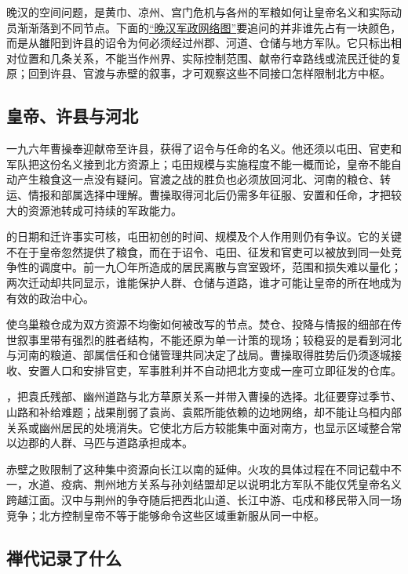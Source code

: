 晚汉的空间问题，是黄巾、凉州、宫门危机与各州的军粮如何让皇帝名义和实际动员渐渐落到不同节点。下面的\hyperref[fig:late-han-regions]{“晚汉军政网络图”}要追问的并非谁先占有一块颜色，而是从雒阳到许县的诏令为何必须经过州郡、河道、仓储与地方军队。它只标出相对位置和几条关系，不能当作州界、实际控制范围、献帝行幸路线或流民迁徙的复原；回到许县、官渡与赤壁的叙事，才可观察这些不同接口怎样限制北方中枢。


\subsection{皇帝、许县与河北}

一九六年曹操奉迎献帝至许县，获得了诏令与任命的名义。他还须以屯田、官吏和军队把这份名义接到北方资源上；屯田规模与实施程度不能一概而论，皇帝不能自动产生粮食这一点没有疑问。官渡之战的胜负也必须放回河北、河南的粮仓、转运、情报和部属选择中理解。曹操取得河北后仍需多年征服、安置和任命，才把较大的资源池转成可持续的军政能力。

的日期和迁许事实可核，屯田初创的时间、规模及个人作用则仍有争议。它的关键不在于皇帝忽然提供了粮食，而在于诏令、屯田、征发和官吏可以被放到同一处竞争性的调度中。前一九〇年所造成的居民离散与宫室毁坏，范围和损失难以量化；两次迁动却共同显示，谁能保护人群、仓储与道路，谁才可能让皇帝的所在地成为有效的政治中心。

使乌巢粮仓成为双方资源不均衡如何被改写的节点。焚仓、投降与情报的细部在传世叙事里带有强烈的胜者结构，不能还原为单一计策的现场；较稳妥的是看到河北与河南的粮道、部属信任和仓储管理共同决定了战局。曹操取得胜势后仍须逐城接收、安置人口和安排官吏，军事胜利并不自动把北方变成一座可立即征发的仓库。

，把袁氏残部、幽州道路与北方草原关系一并带入曹操的选择。北征要穿过季节、山路和补给难题；战果削弱了袁尚、袁熙所能依赖的边地网络，却不能让乌桓内部关系或幽州居民的处境消失。它使北方后方较能集中面对南方，也显示区域整合常以边郡的人群、马匹与道路承担成本。

赤壁之败限制了这种集中资源向长江以南的延伸。火攻的具体过程在不同记载中不一，水道、疫病、荆州地方关系与孙刘结盟却足以说明北方军队不能仅凭皇帝名义跨越江面。汉中与荆州的争夺随后把西北山道、长江中游、屯戍和移民带入同一场竞争；北方控制皇帝不等于能够命令这些区域重新服从同一中枢。

\subsection{禅代记录了什么}

